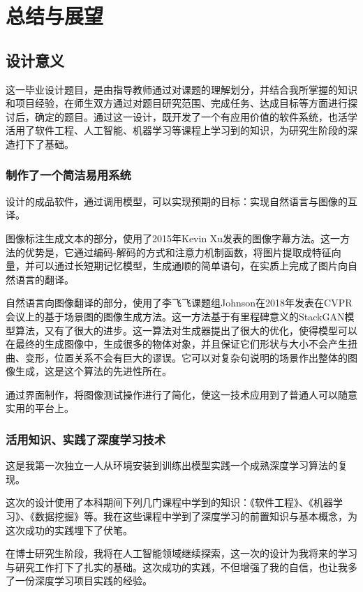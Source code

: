 
\chapter{总结与展望}
\section{设计意义}
这一毕业设计题目，是由指导教师通过对课题的理解划分，并结合我所掌握的知识和项目经验，在师生双方通过对题目研究范围、完成任务、达成目标等方面进行探讨后，确定的题目。通过这一设计，既开发了一个有应用价值的软件系统，也活学活用了软件工程、人工智能、机器学习等课程上学习到的知识，为研究生阶段的深造打下了基础。

\subsection{制作了一个简洁易用系统}
设计的成品软件，通过调用模型，可以实现预期的目标：实现自然语言与图像的互译。

图像标注生成文本的部分，使用了2015年Kevin Xu发表的图像字幕方法。这一方法的优势是，它通过编码-解码的方式和注意力机制函数，将图片提取成特征向量，并可以通过长短期记忆模型，生成通顺的简单语句，在实质上完成了图片向自然语言的翻译。

自然语言向图像翻译的部分，使用了李飞飞课题组Johnson在2018年发表在CVPR会议上的基于场景图的图像生成方法。这一方法基于有里程碑意义的StackGAN模型算法，又有了很大的进步。这一算法对生成器提出了很大的优化，使得模型可以在最终的生成图像中，生成很多的物体对象，并且保证它们形状与大小不会产生扭曲、变形，位置关系不会有巨大的谬误。它可以对复杂句说明的场景作出整体的图像生成，这是这个算法的先进性所在。

通过界面制作，将图像测试操作进行了简化，使这一技术应用到了普通人可以随意实用的平台上。

\subsection{活用知识、实践了深度学习技术}
这是我第一次独立一人从环境安装到训练出模型实践一个成熟深度学习算法的复现。

这次的设计使用了本科期间下列几门课程中学到的知识：《软件工程》、《机器学习》、《数据挖掘》等。我在这些课程中学到了深度学习的前置知识与基本概念，为这次成功的实践埋下了伏笔。

在博士研究生阶段，我将在人工智能领域继续探索，这一次的设计为我将来的学习与研究工作打下了扎实的基础。这次成功的实践，不但增强了我的自信，也让我多了一份深度学习项目实践的经验。

